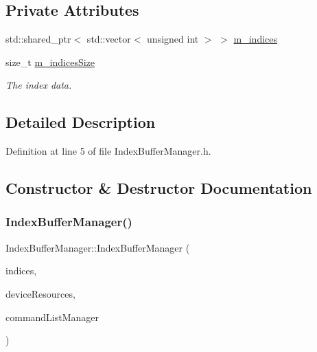 \subsection*{Private Attributes}
\begin{DoxyCompactItemize}
\item 
std\+::shared\+\_\+ptr$<$ std\+::vector$<$ unsigned int $>$ $>$ \mbox{\hyperlink{class_index_buffer_manager_ade308a27ee394d550f91c919411df37b}{m\+\_\+indices}}
\item 
size\+\_\+t \mbox{\hyperlink{class_index_buffer_manager_ae21d575fdd0af30b3050c5747f20ad66}{m\+\_\+indices\+Size}}
\begin{DoxyCompactList}\small\item\em The index data. \end{DoxyCompactList}\end{DoxyCompactItemize}


\subsection{Detailed Description}


Definition at line 5 of file Index\+Buffer\+Manager.\+h.



\subsection{Constructor \& Destructor Documentation}
\mbox{\label{class_index_buffer_manager_a58352b8fc2032a4e29faed7fbe249ea0}} 
\subsubsection{\texorpdfstring{Index\+Buffer\+Manager()}{IndexBufferManager()}}
{\footnotesize\ttfamily Index\+Buffer\+Manager\+::\+Index\+Buffer\+Manager (\begin{DoxyParamCaption}\item[{std\+::shared\+\_\+ptr$<$ std\+::vector$<$ unsigned int $>$$>$}]{indices,  }\item[{const std\+::shared\+\_\+ptr$<$ \mbox{\hyperlink{class_d_x_1_1_device_resources}{D\+X\+::\+Device\+Resources}} $>$}]{device\+Resources,  }\item[{const std\+::shared\+\_\+ptr$<$ \mbox{\hyperlink{class_command_list_manager}{Command\+List\+Manager}} $>$}]{command\+List\+Manager }\end{DoxyParamCaption})}



